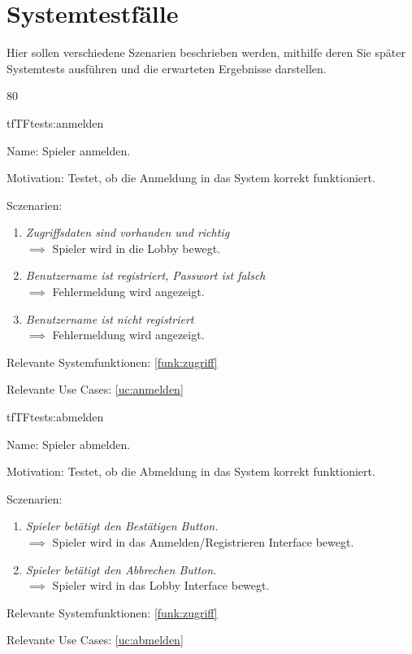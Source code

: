 \chapter{Systemtestfälle}

Hier sollen verschiedene Szenarien beschrieben werden, mithilfe deren Sie später Systemtests ausführen und die erwarteten Ergebnisse darstellen.

\setcounter{tf}{10} 
80


\begin{description}[leftmargin=5em, style=sameline]

\begin{lhp}{tf}{TF}{tests:anmelden}
	\item [Name:] Spieler anmelden.
	\item [Motivation:] Testet, ob die Anmeldung in das System korrekt funktioniert.
	\item [Sczenarien:] \hfill
		\begin{enumerate}
			\item \textit{Zugriffsdaten sind vorhanden und richtig} \\ $\implies$ Spieler wird in die Lobby bewegt.
			\item \textit{Benutzername ist registriert, Passwort ist falsch} \\ $\implies$ Fehlermeldung wird angezeigt.
			\item \textit{Benutzername ist nicht registriert} \\ $\implies$ Fehlermeldung wird angezeigt.
		\end{enumerate}
	\item [Relevante Systemfunktionen:] \ref{funk:zugriff}
	\item [Relevante Use Cases:] \ref{uc:anmelden}
\end{lhp}

\begin{lhp}{tf}{TF}{tests:abmelden}
	\item [Name:] Spieler abmelden.
	\item [Motivation:] Testet, ob die Abmeldung in das System korrekt funktioniert.
	\item [Sczenarien:] \hfill
		\begin{enumerate}
			\item \textit{Spieler betätigt den Bestätigen Button.} \\ $\implies$ Spieler wird in das Anmelden/Registrieren Interface bewegt.
			\item \textit{Spieler betätigt den Abbrechen Button.} \\ $\implies$ Spieler wird in das Lobby Interface bewegt.
		\end{enumerate}
	\item [Relevante Systemfunktionen:] \ref{funk:zugriff}
	\item [Relevante Use Cases:] \ref{uc:abmelden}
\end{lhp}


\end{description}
